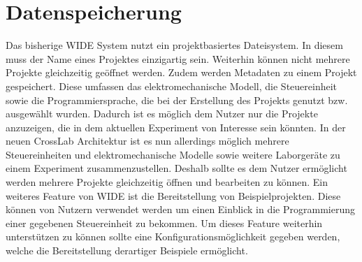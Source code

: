\section{Datenspeicherung} \label{konzeption-datenspeicherung}

Das bisherige WIDE System nutzt ein projektbasiertes Dateisystem. In diesem muss der Name eines Projektes einzigartig sein. Weiterhin können nicht mehrere Projekte gleichzeitig geöffnet werden. Zudem werden Metadaten zu einem Projekt gespeichert. Diese umfassen das elektromechanische Modell, die Steuereinheit sowie die Programmiersprache, die bei der Erstellung des Projekts genutzt bzw. ausgewählt wurden. Dadurch ist es möglich dem Nutzer nur die Projekte anzuzeigen, die in dem aktuellen Experiment von Interesse sein könnten. In der neuen CrossLab Architektur ist es nun allerdings möglich mehrere Steuereinheiten und elektromechanische Modelle sowie weitere Laborgeräte zu einem Experiment zusammenzustellen. Deshalb sollte es dem Nutzer ermöglicht werden mehrere Projekte gleichzeitig öffnen und bearbeiten zu können. Ein weiteres Feature von WIDE ist die Bereitstellung von Beispielprojekten. Diese können von Nutzern verwendet werden um einen Einblick in die Programmierung einer gegebenen Steuereinheit zu bekommen. Um dieses Feature weiterhin unterstützen zu können sollte eine Konfigurationsmöglichkeit gegeben werden, welche die Bereitstellung derartiger Beispiele ermöglicht. 